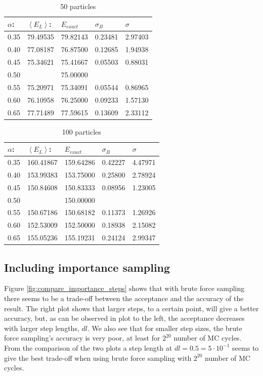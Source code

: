 \begin{table}[H]\caption{50 particles}\label{tab:brute_force_N_50}
\begin{tabular}{lllll}
$\alpha$: & $\left< E_L \right>$:& $E_{exact}$ & $\sigma_B$ & $\sigma$\\ \hline
0.35 & 79.49535 & 79.82143 & 0.23481 & 2.97403\\
0.40 & 77.08187 & 76.87500 & 0.12685 & 1.94938\\
0.45 & 75.34621 & 75.41667 & 0.05503 & 0.88031\\
0.50 &                   & 75.00000 &                &                \\ 
0.55 & 75.20971 & 75.34091 & 0.05544 & 0.86965\\
0.60 & 76.10958 & 76.25000 & 0.09233 & 1.57130\\
0.65 & 77.71489 & 77.59615 & 0.13609 & 2.33112\\
\end{tabular}
\end{table} 

\begin{table}[H]\caption{100 particles}\label{tab:brute_force_N_100}
\begin{tabular}{lllll}
$\alpha$: & $\left< E_L \right>$:& $E_{exact}$ & $\sigma_B$ & $\sigma$\\ \hline
0.35 & 160.41867 & 159.64286 & 0.42227 & 4.47971\\
0.40 & 153.99383 & 153.75000 & 0.25800 & 2.78924\\
0.45 & 150.84608 & 150.83333 & 0.08956 & 1.23005\\
0.50 &                     & 150.00000 &                 &                \\ 
0.55 & 150.67186 & 150.68182 & 0.11373 & 1.26926\\
0.60 & 152.53009 & 152.50000 & 0.18938 & 2.15082\\
0.65 & 155.05236 & 155.19231 & 0.24124 & 2.99347\\
\end{tabular}
\end{table} 

\subsection{Including importance sampling}

Figure \ref{fig:compare_importance_steps} shows that with brute force sampling there seems to be a trade-off between the acceptance and the accuracy of the result. The right plot shows that larger steps, to a certain point, will give a better accuracy, but, as can be observed in plot to the left, the acceptance decreases with larger step lengths, $dl$. We also see that for smaller step sizes, the brute force sampling's accuracy is very poor, at least for $2^{20}$ number of MC cycles. From the comparison of the two plots a  step length at $dl = 0.5 = 5\cdot10^{-1}$ seems to give the best trade-off when using brute force sampling with $2^{20}$ number of MC cycles.

